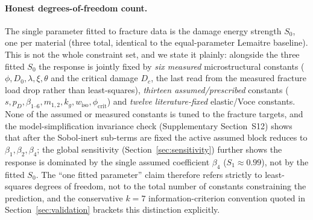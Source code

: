 \documentclass[12pt,a4paper,twocolumn]{article}
\begin{document}
\paragraph{Honest degrees-of-freedom count.}
The single parameter fitted to fracture data is the damage energy strength $S_0$, one per material (three total, identical to the equal-parameter Lemaitre baseline). This is not the whole constraint set, and we state it plainly: alongside the three fitted $S_0$ the response is jointly fixed by \emph{six measured} microstructural constants ($\phi, D_0, \lambda, \xi, \theta$ and the critical damage $D_c$, the last read from the measured fracture load drop rather than least-squares), \emph{thirteen assumed/prescribed} constants ($s, p_D, \beta_{1\text{--}6}, m_{1,2}, k_g, w_{\mathrm{iso}}, \phi_{\mathrm{crit}}$) and \emph{twelve literature-fixed} elastic/Voce constants. None of the assumed or measured constants is tuned to the fracture targets, and the model-simplification invariance check (Supplementary Section~S12) shows that after the Sobol-inert sub-terms are fixed the active assumed block reduces to $\beta_1, \beta_2, \beta_4$; the global sensitivity (Section~\ref{sec:sensitivity}) further shows the response is dominated by the single assumed coefficient $\beta_4$ ($S_1 \approx 0.99$), not by the fitted $S_0$. The ``one fitted parameter'' claim therefore refers strictly to least-squares degrees of freedom, not to the total number of constants constraining the prediction, and the conservative $k=7$ information-criterion convention quoted in Section~\ref{sec:validation} brackets this distinction explicitly.
\end{document}
